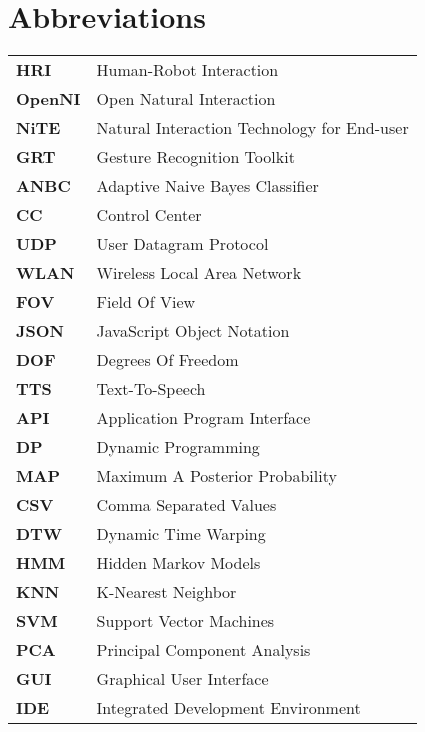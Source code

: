 \chapter*{Abbreviations}
\begin{center}
	\begin{tabular}
		{ll}

		\textbf{HRI} & Human-Robot Interaction\\		
		\textbf{OpenNI} & Open Natural Interaction\\
		\textbf{NiTE} & Natural Interaction Technology for End-user\\
		\textbf{GRT} & Gesture Recognition Toolkit\\
		\textbf{ANBC} & Adaptive Naive Bayes Classifier\\
		\textbf{CC} & Control Center\\
		\textbf{UDP} & User Datagram Protocol\\
		\textbf{WLAN} & Wireless Local Area Network\\				
		\textbf{FOV} & Field Of View\\
		\textbf{JSON} & JavaScript Object Notation\\
		\textbf{DOF} & Degrees Of Freedom\\
		\textbf{TTS} & Text-To-Speech\\
		\textbf{API} & Application Program Interface\\		
		\textbf{DP} & Dynamic Programming\\		
		\textbf{MAP} & Maximum A Posterior Probability\\
		\textbf{CSV} & Comma Separated Values\\
		\textbf{DTW} & Dynamic Time Warping\\
		\textbf{HMM} & Hidden Markov Models\\
		\textbf{KNN} & K-Nearest Neighbor\\
		\textbf{SVM} & Support Vector Machines\\
		\textbf{PCA} & Principal Component Analysis\\
		\textbf{GUI} & Graphical User Interface\\
		\textbf{IDE} & Integrated Development Environment\\		
		
	\end{tabular}
\end{center}


